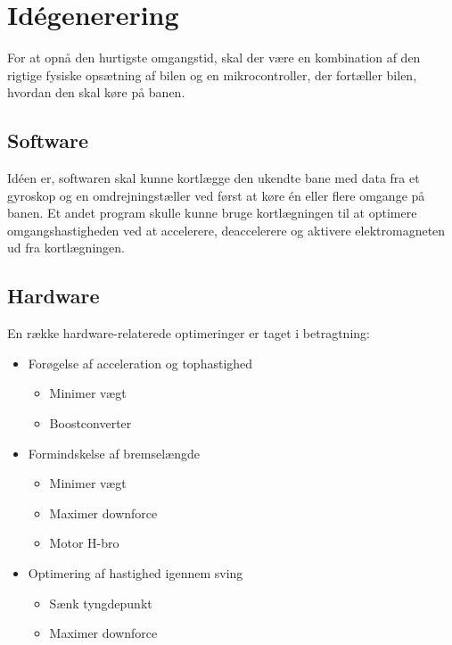 
\newpage
\section{Idégenerering}
For at opnå den hurtigste omgangstid, skal der være en kombination af den rigtige fysiske opsætning af bilen og en mikrocontroller, der fortæller bilen, hvordan den skal køre på banen.

\subsection{Software}
Idéen er, softwaren skal kunne kortlægge den ukendte bane med data fra et gyroskop og en omdrejningstæller ved først at køre én eller flere omgange på banen.
Et andet program skulle kunne bruge kortlægningen til at optimere omgangshastigheden ved at accelerere, deaccelerere og aktivere elektromagneten ud fra kortlægningen.

\subsection{Hardware}
En række hardware-relaterede optimeringer er taget i betragtning:
\begin{itemize}
\item Forøgelse af acceleration og tophastighed
	\begin{itemize}
		\item Minimer vægt
		\item Boostconverter
	\end{itemize}
\item Formindskelse af bremselængde
	\begin{itemize}
		\item Minimer vægt
		\item Maximer downforce
		\item Motor H-bro
	\end{itemize}
\item Optimering af hastighed igennem sving
	\begin{itemize}
		\item Sænk tyngdepunkt
		\item Maximer downforce
	\end{itemize}
\end{itemize}
